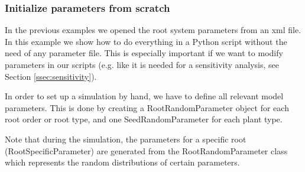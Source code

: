 

\subsubsection*{Initialize parameters from scratch} \label{sec:from_scratch}
 
In the previous examples we opened the root system parameters from an xml file. In this example we show how to do everything in a Python script without the need of any parameter file. This is especially important if we want to modify parameters in our scripts (e.g. like it is needed for a sensitivity analysis, see Section \ref{ssec:sensitivity}).

In order to set up a simulation by hand, we have to define all relevant model parameters. This is done by creating a RootRandomParameter object for each root order or root type, and one SeedRandomParameter for each plant type. 

Note that during the simulation, the parameters for a specific root (RootSpecificParameter) are generated from the RootRandomParameter class which represents the random distributions of certain parameters.



